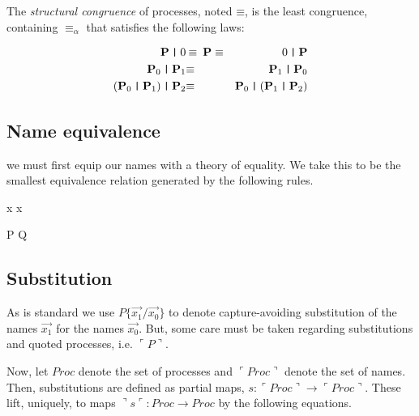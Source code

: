 \documentclass[]{amsart}
\newcommand{\lpquote}{\ulcorner}
\newcommand{\rpquote}{\urcorner}
\newcommand{\id}[1]{\texttt{#1}}
\newcommand{\pzero}{\mathbin{0}}
\newcommand{\juxtap}{\mathbin{\id{|}}}
\newcommand{\scong}{\mathbin{\equiv}}
\newcommand{\nameeq}{\mathbin{\equiv_N}}
\newcommand{\alphaeq}{\mathbin{\equiv_{\alpha}}}
\newcommand{\quotep}[1]{\lpquote #1 \rpquote}
\newcommand{\dropn}[1]{\rpquote #1 \lpquote}
\newcommand{\Proc}{\mathbin{Proc}}
\newcommand{\QProc}{\quotep{\mathbin{Proc}}}
\newcommand{\category}[1]{\mbox{\bf #1}}
\theoremstyle{definition}
\theoremstyle{remark}
\numberwithin{equation}{subsection}
\begin{document}
The {\em structural congruence} of processes, noted $\scong$, is the
least congruence, containing $\alphaeq$ that satisfies the following
laws:

\begin{eqnarray*}
	\category{P} \juxtap \pzero	
		&  \scong \; \category{P} \; \scong & 
			\pzero \juxtap \category{P} \\
	\category{P}_0 \juxtap \category{P}_1	
		& \scong & 
			\category{P}_1 \juxtap \category{P}_0 \\
	(\category{P}_0 \juxtap \category{P}_1) \juxtap \category{P}_2	
		& \scong & 
			\category{P}_0 \juxtap (\category{P}_1 \juxtap \category{P}_2) \\
\end{eqnarray*}

\subsection{Name equivalence}

we must first equip our names with a theory of equality. We take this
to be the smallest equivalence relation generated by the following
rules.

{ \quotep{\dropn{x}} \nameeq x }

\infrule[Struct-equiv]
{ P \scong Q }
{ \quotep{P} \nameeq \quotep{Q} }

\subsection{Substitution}

As is standard we use $P\id{\{}\vec{x_1} / \vec{x_0} \id{\}}$ to
denote capture-avoiding substitution of the names $\vec{x_1}$ for the
names $\vec{x_0}$. But, some care must be taken regarding
substitutions and quoted processes, i.e. $\quotep{P}$. 

Now, let $\Proc$ denote the set of processes and
$\QProc$ denote the set of names. Then, substitutions
are defined as partial maps, $s : \QProc \rightarrow \QProc$. These lift, uniquely, to maps $\dropn{s} :
\Proc \rightarrow \Proc$ by the following equations.
\end{document}
